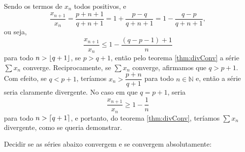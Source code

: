 \documentclass{IMTexam}
\DeclarePairedDelimiter\ceil{\lceil}{\rceil}
\DeclarePairedDelimiter\floor{\lfloor}{\rfloor}
\begin{document}
\begin{questions}
\begin{solution}
            Sendo os termos de $x_n$ todos positivos, e
            \[
                \dfrac{x_{n+1}}{x_n}=\dfrac{p+n+1}{q+n+1} =
                1+\dfrac{p-q}{q+n+1}=1-\dfrac{q-p}{q+n+1},
            \]
            ou seja,
            \[ \dfrac{x_{n+1}}{x_n}\leqslant 1-\dfrac{(q-p-1)+1}{n} \]
            para todo $n>\floor{q+1}$, se $p>q+1$, então pelo
            teorema \ref{thm:divConv} a série $\sum x_n$ converge. Reciprocamente, se $\sum
            x_n$ converge, afirmamos que $q>p+1$. Com efeito, se
            $q<p+1$, teríamos $x_n>\dfrac{p+n}{q+1}$ para todo
            $n\in\mathbb{N}$ e, então a série seria claramente divergente.
            No caso em que $q=p+1$, seria
            \[ \dfrac{x_{n+1}}{x_n}\geqslant 1-\dfrac{1}{n} \]
            para todo $n>\ceil{q+1}$, e portanto, do teorema \ref{thm:divConv}, teríamos
            $\sum x_n$ divergente, como se queria demonstrar.
        \end{solution}

        \question Decidir se as séries abaixo convergem e se convergem
        absolutamente:

\end{questions}
\end{document}
